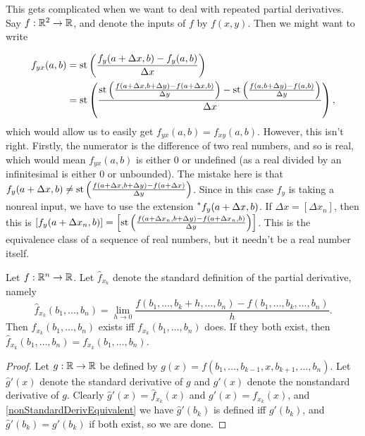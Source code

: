 This gets complicated when we want to deal with repeated partial derivatives. Say $f: \mathbb{R}^2 \to \mathbb{R}$, and denote the inputs of $f$ by $f(x, y)$. Then we might want to write

\begin{align*}
    f_{yx}(a, b) &= \operatorname{st}\left(\frac{f_y(a + \Delta x, b) - f_y(a, b)}{\Delta x}\right) \\
        &= \operatorname{st}\left(\frac{\operatorname{st}\left(\frac{f(a + \Delta x, b + \Delta y) - f(a + \Delta x, b)}{\Delta y}\right) - \operatorname{st}\left(\frac{f(a, b + \Delta y) - f(a, b)}{\Delta y}\right)}{\Delta x}\right),
\end{align*}
which would allow us to easily get $f_{yx}(a, b)= f_{xy}(a, b)$. However, this isn't right. Firstly, the numerator is the difference of two real numbers, and so is real, which would mean $f_{yx}(a, b)$ is either $0$ or undefined (as a real divided by an infinitesimal is either $0$ or unbounded). The mistake here is that $f_y(a + \Delta x, b) \neq \operatorname{st}\left(\frac{f(a + \Delta x, b + \Delta y) - f(a + \Delta x)}{\Delta y}\right)$. Since in this case $f_y$ is taking a nonreal input, we have to use the extension $\prescript{*}{}{f_y}(a + \Delta x, b)$. If $\Delta x = [\Delta x_n]$, then this is $[f_y(a + \Delta x_n, b)] = \left[\operatorname{st}\left(\frac{f(a + \Delta x_n, b + \Delta y) - f(a + \Delta x_n, b)}{\Delta y}\right)\right]$. This is the equivalence class of a sequence of real numbers, but it needn't be a real number itself.

\begin{thm}
    Let $f: \mathbb{R}^n \to \mathbb{R}$. Let $\hat{f}_{x_k}$ denote the standard definition of the partial derivative, namely
    \[ \hat{f}_{x_k}(b_1, \ldots, b_n) = \lim_{h \to 0} \frac{f(b_1, \ldots, b_k + h, \ldots, b_n) - f(b_1, \ldots, b_k, \ldots, b_n)}{h} .\]
    Then $\hat{f}_{x_k}(b_1, \ldots, b_n)$ exists iff $f_{x_k}(b_1, \ldots, b_n)$ does. If they both exist, then $\hat{f}_{x_k}(b_1, \ldots, b_n) = f_{x_k}(b_1, \ldots, b_n)$.
\end{thm}

\begin{proof}
    Let $g: \mathbb{R} \to \mathbb{R}$ be defined by $g(x) = f(b_1, \ldots, b_{k-1}, x, b_{k+1}, \ldots, b_n)$. Let $\hat{g}'(x)$ denote the standard derivative of $g$ and $g'(x)$ denote the nonstandard derivative of $g$. Clearly $\hat{g}'(x) = \hat{f}_{x_k}(x)$ and $g'(x) = f_{x_k}(x)$, and \autoref{nonStandardDerivEquivalent} we have $\hat{g}'(b_k)$ is defined iff $g'(b_k)$, and $\hat{g}'(b_k) = g'(b_k)$ if both exist, so we are done.
\end{proof}

